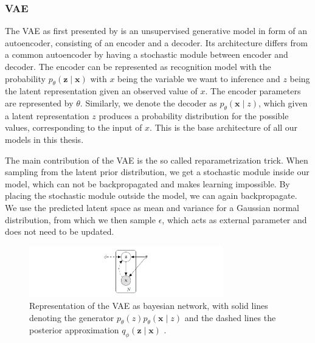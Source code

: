 \subsubsection{VAE}
\label{ssection:VAE}



The VAE as first presented by \cite{kingma_auto-encoding_2014} is an unsupervised generative model in form of an autoencoder, consisting of an encoder and a decoder. Its architecture differs from a common autoencoder by having a stochastic module between encoder and decoder. The encoder can be represented as recognition model with the probability $p_{{\theta}}(\mathbf{z} \mid \mathbf{x})$ with $x$ being the variable we want to inference and $z$ being the latent representation given an observed value of $x$. The encoder parameters are represented by $\theta$. Similarly, we denote the decoder as $p_{{\theta}}(\mathbf{x} \mid z)$, which given a latent representation $z$ produces a probability distribution for the possible values, corresponding to the input of $x$. This is the base architecture of all our models in this thesis.

The main contribution of the VAE is the so called reparametrization trick. When sampling from the latent prior distribution, we get a stochastic module inside our model, which can not be backpropagated and makes learning impossible. By placing the stochastic module outside the model, we can again backpropagate. We use the predicted latent space as mean and variance for a Gaussian normal distribution, from which we then sample $\epsilon$, which acts as external parameter and does not need to be updated.

\begin{figure}[h]
    \centering
    \includegraphics[width=0.75\textwidth]{data/images/repaTrick.png}
    \caption{Representation of the VAE as bayesian network, with solid lines denoting the generator $p_{{\theta}}(z)p_{{\theta}}(\mathbf{x} \mid z)$ and the dashed lines the posterior approximation $q_{\phi}(\mathbf{z} \mid \mathbf{x})$ \cite{kingma_auto-encoding_2014}.}
    \label{fig:varinference}
\end{figure}


